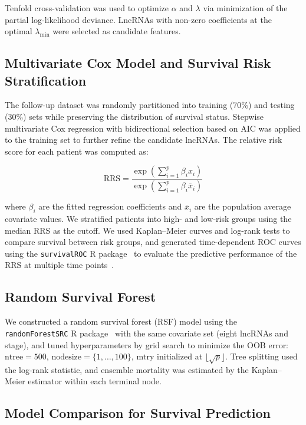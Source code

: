 \documentclass[12pt,a4paper]{article}
\begin{document}
Tenfold cross-validation was used to optimize $\alpha$ and $\lambda$ via minimization of the partial log-likelihood deviance. LncRNAs with non-zero coefficients at the optimal $\lambda_{\min}$ were selected as candidate features.

\subsection{Multivariate Cox Model and Survival Risk Stratification}

The follow-up dataset was randomly partitioned into training (70\%) and testing (30\%) sets while preserving the distribution of survival status. Stepwise multivariate Cox regression with bidirectional selection based on AIC was applied to the training set to further refine the candidate lncRNAs. The relative risk score for each patient was computed as:

\begin{equation}
\text{RRS} = \frac{\exp\left(\sum_{i=1}^{p}\beta_i x_i\right)}{\exp\left(\sum_{i=1}^{p}\beta_i \bar{x}_i\right)}
\end{equation}

where $\beta_i$ are the fitted regression coefficients and $\bar{x}_i$ are the population average covariate values. We stratified patients into high- and low-risk groups using the median RRS as the cutoff. We used Kaplan--Meier curves and log-rank tests to compare survival between risk groups, and generated time-dependent ROC curves using the \texttt{survivalROC} R package~\cite{ref23} to evaluate the predictive performance of the RRS at multiple time points~\cite{ref24}.

\subsection{Random Survival Forest}

We constructed a random survival forest (RSF) model using the \texttt{randomForestSRC} R package~\cite{ref25} with the same covariate set (eight lncRNAs and stage), and tuned hyperparameters by grid search to minimize the OOB error: $\text{ntree} = 500$, $\text{nodesize} = \{1, \dots, 100\}$, $\text{mtry}$ initialized at $\lfloor\sqrt{p}\rfloor$. Tree splitting used the log-rank statistic, and ensemble mortality was estimated by the Kaplan--Meier estimator within each terminal node.

\subsection{Model Comparison for Survival Prediction}
\end{document}
